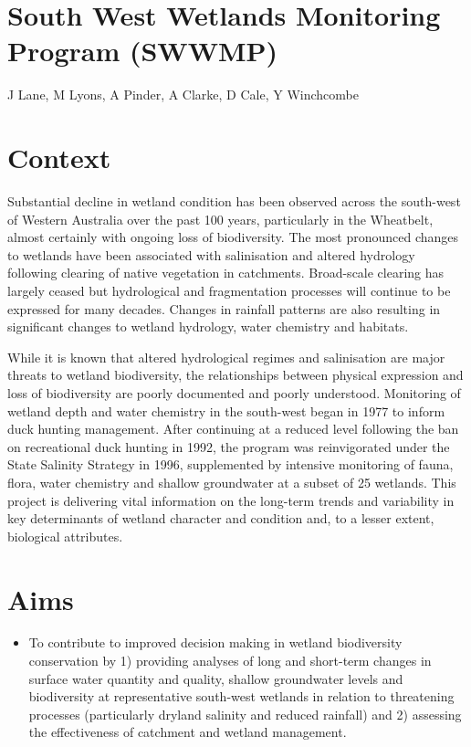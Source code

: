 \documentclass[version=last,
    paper=a4, %
    10pt, %
    usenames,
    dvipsnames,
    oneside, %
    headings=openany, %
    DIV=15 %
]{scrbook}
\begin{document}
\section*{South West Wetlands Monitoring Program (SWWMP)
}

J Lane, M Lyons, A Pinder, A Clarke, D Cale, Y Winchcombe



\section*{Context}

Substantial decline in wetland condition has been observed across the
south-west of Western Australia over the past 100 years, particularly in
the Wheatbelt, almost certainly with ongoing loss of biodiversity. The
most pronounced changes to wetlands have been associated with
salinisation and altered hydrology following clearing of native
vegetation in catchments. Broad-scale clearing has largely ceased but
hydrological and fragmentation processes will continue to be expressed
for many decades. Changes in rainfall patterns are also resulting in
significant changes to wetland hydrology, water chemistry and habitats.

While it is known that altered hydrological regimes and salinisation are
major threats to wetland biodiversity, the relationships between
physical expression and loss of biodiversity are poorly documented and
poorly understood. Monitoring of wetland depth and water chemistry in
the south-west began in 1977 to inform duck hunting management. After
continuing at a reduced level following the ban on recreational duck
hunting in 1992, the program was reinvigorated under the State Salinity
Strategy in 1996, supplemented by intensive monitoring of fauna, flora,
water chemistry and shallow groundwater at a subset of 25 wetlands. This
project is delivering vital information on the long-term trends and
variability in key determinants of wetland character and condition and,
to a lesser extent, biological attributes.




\section*{Aims}

\begin{itemize}
\itemsep1pt\parskip0pt
\item
  To contribute to improved decision making in wetland biodiversity
  conservation by 1) providing analyses of long and short-term changes
  in surface water quantity and quality, shallow groundwater levels and
  biodiversity at representative south-west wetlands in relation to
  threatening processes (particularly dryland salinity and reduced
  rainfall) and 2) assessing the effectiveness of catchment and wetland
  management.
\end{itemize}
\end{document}

